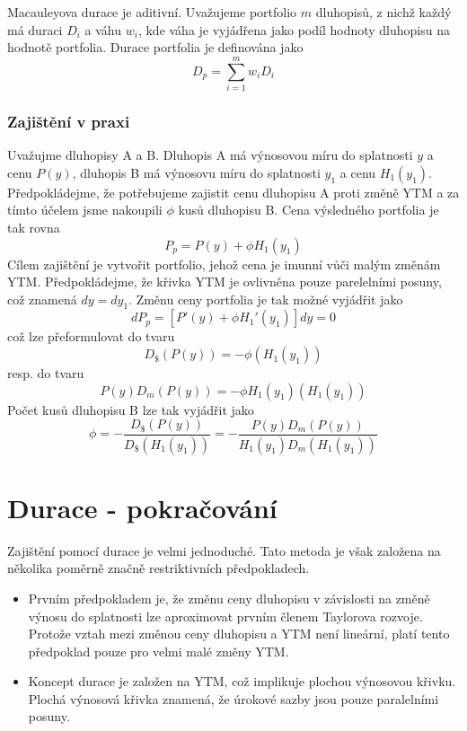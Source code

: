 \documentclass[a4paper]{book}
\begin{document}
Macauleyova durace je aditivní. Uvažujeme portfolio $m$ dluhopisů, z nichž každý má duraci $D_i$ a váhu $w_i$, kde váha je vyjádřena jako podíl hodnoty dluhopisu na hodnotě portfolia. Durace portfolia je definována jako
\begin{equation*}
D_p = \sum_{i=1}^m w_i D_i
\end{equation*}

\subsection{Zajištění v praxi}

Uvažujme dluhopisy A a B. Dluhopis A má výnosovou míru do splatnosti $y$ a cenu $P(y)$, dluhopis B má výnosovu míru do splatnosti $y_1$ a cenu $H_1(y_1)$. Předpokládejme, že potřebujeme zajistit cenu dluhopisu A proti změně YTM a za tímto účelem jsme nakoupili $\phi$ kusů dluhopisu B. Cena výsledného portfolia je tak rovna
\begin{equation*}
P_p = P(y) + \phi H_1(y_1)
\end{equation*}
Cílem zajištění je vytvořit portfolio, jehož cena je imunní vůči malým změnám YTM. Předpokládejme, že křivka YTM je ovlivněna pouze parelelními posuny, což znamená $dy = dy_1$. Změnu ceny portfolia je tak možné vyjádřit jako
\begin{equation*}
dP_p = [P'(y) + \phi H_1'(y_1)]dy = 0
\end{equation*}
což lze přeformulovat do tvaru
\begin{equation*}
D_\$(P(y)) = - \phi (H_1(y_1))
\end{equation*}
resp. do tvaru
\begin{equation*}
P(y)D_m(P(y)) = - \phi H_1(y_1)(H_1(y_1))
\end{equation*}
Počet kusů dluhopisu B lze tak vyjádřit jako
\begin{equation*}
\phi = - \frac{D_\$(P(y))}{D_\$(H_1(y_1))} = - \frac{P(y)D_m(P(y))}{H_1(y_1)D_m(H_1(y_1))}
\end{equation*}

\chapter{Durace - pokračování}

Zajištění pomocí durace je velmi jednoduché. Tato metoda je však založena na několika poměrně značně restriktivních předpokladech.
\begin{itemize}
\item Prvním předpokladem je, že změnu ceny dluhopisu v závislosti na změně výnosu do splatnosti lze aproximovat prvním členem Taylorova rozvoje. Protože vztah mezi změnou ceny dluhopisu a YTM není lineární, platí tento předpoklad pouze pro velmi malé změny YTM.
\item Koncept durace je založen na YTM, což implikuje plochou výnosovou křivku. Plochá výnosová křivka znamená, že úrokové sazby jsou pouze paralelními posuny.
\end{itemize}
\end{document}
